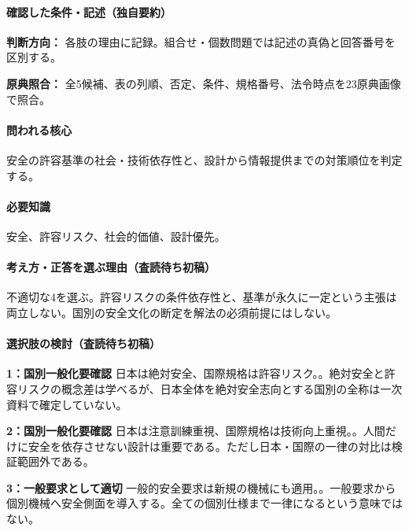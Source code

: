 \paragraph{確認した条件・記述（独自要約）}\mbox{}\par

\noindent\textbf{判断方向：} 各肢の理由に記録。組合せ・個数問題では記述の真偽と回答番号を区別する。\par

\noindent\textbf{原典照合：} 全5候補、表の列順、否定、条件、規格番号、法令時点を23原典画像で照合。\par

\paragraph{問われる核心} 安全の許容基準の社会・技術依存性と、設計から情報提供までの対策順位を判定する。

\paragraph{必要知識} 安全、許容リスク、社会的価値、設計優先。

\paragraph{考え方・正答を選ぶ理由（査読待ち初稿）} 不適切な4を選ぶ。許容リスクの条件依存性と、基準が永久に一定という主張は両立しない。国別の安全文化の断定を解法の必須前提にはしない。

\paragraph{選択肢の検討（査読待ち初稿）}\mbox{}\par

\noindent\textbf{1：国別一般化要確認} 日本は絶対安全、国際規格は許容リスク。。絶対安全と許容リスクの概念差は学べるが、日本全体を絶対安全志向とする国別の全称は一次資料で確定していない。\par

\noindent\textbf{2：国別一般化要確認} 日本は注意訓練重視、国際規格は技術向上重視。。人間だけに安全を依存させない設計は重要である。ただし日本・国際の一律の対比は検証範囲外である。\par

\noindent\textbf{3：一般要求として適切} 一般的安全要求は新規の機械にも適用。。一般要求から個別機械へ安全側面を導入する。全ての個別仕様まで一律になるという意味ではない。\par

